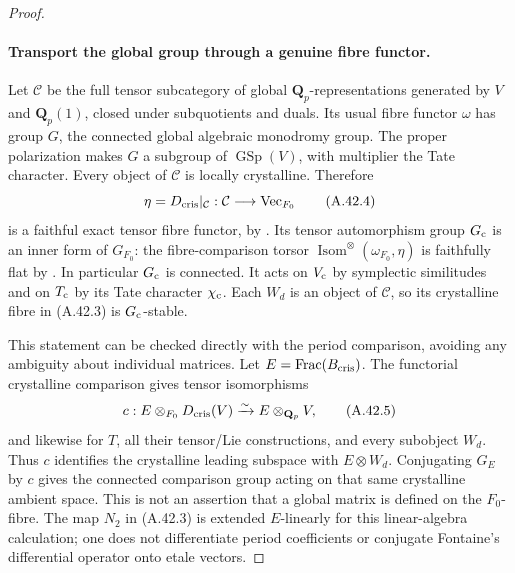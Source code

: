 \begin{proof}
\paragraph{Transport the global group through a genuine fibre functor.}
Let \(\mathcal C\) be the full tensor subcategory of
global \(\mathbf Q_p\)-representations generated by
\(V\) and \(\mathbf Q_p(1)\), closed under subquotients
and duals. Its usual fibre functor \(\omega\) has group
\(G\), the connected global algebraic monodromy group.
The proper polarization makes \(G\) a subgroup of
\(\operatorname{GSp}(V)\), with multiplier the Tate
character. Every object of \(\mathcal C\) is locally
crystalline. Therefore
\[
                    \eta=D_{\rm cris}|_{\mathcal C}
                               :\mathcal C\longrightarrow\operatorname{Vec}_{F_0}
                                                               \tag{A.42.4}
\]
is a faithful exact tensor fibre functor, by
\cite[Theorem 5.2.1 and Proposition 9.1.6]{fghBrinonConrad}.
Its tensor automorphism group \(G_{\rm c}\) is an
inner form of \(G_{F_0}\): the fibre-comparison torsor
\(\operatorname{Isom}^{\otimes}(\omega_{F_0},\eta)\)
is faithfully flat by
\cite[Theorem 3.2, p.31]{fghDeligneMilneTC}.
In particular \(G_{\rm c}\) is connected. It acts on
\(V_{\rm c}\) by symplectic similitudes and on
\(T_{\rm c}\) by its Tate character \(\chi_{\rm c}\).
Each \(W_d\) is an object of \(\mathcal C\), so its
crystalline fibre in (A.42.3) is \(G_{\rm c}\)-stable.

This statement can be checked directly with the period
comparison, avoiding any ambiguity about individual
matrices. Let \(E=\operatorname{Frac}(B_{\rm cris})\).
The functorial crystalline comparison gives tensor
isomorphisms
\[
 c:E\otimes_{F_0}D_{\rm cris}(V)
                       \xrightarrow{\sim}E\otimes_{\mathbf Q_p}V,
                                                               \tag{A.42.5}
\]
and likewise for \(T\), all their tensor/Lie
constructions, and every subobject \(W_d\). Thus
\(c\) identifies the crystalline leading subspace
with \(E\otimes W_d\). Conjugating \(G_E\) by
\(c\) gives the connected comparison group acting
on that same crystalline ambient space. This is not
an assertion that a global matrix is defined on the
\(F_0\)-fibre. The map \(N_2\) in (A.42.3) is
extended \(E\)-linearly for this linear-algebra
calculation; one does not differentiate period
coefficients or conjugate Fontaine's differential
operator onto etale vectors.


\end{proof}

